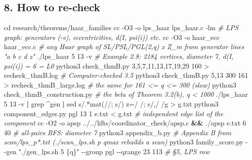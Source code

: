 \documentclass[
  10pt,
]{article}
\newenvironment{Shaded}{}{}
\newcommand{\AttributeTok}[1]{\textcolor[rgb]{0.49,0.56,0.16}{#1}}
\newcommand{\BuiltInTok}[1]{\textcolor[rgb]{0.00,0.50,0.00}{#1}}
\newcommand{\CommentTok}[1]{\textcolor[rgb]{0.38,0.63,0.69}{\textit{#1}}}
\newcommand{\ExtensionTok}[1]{#1}
\newcommand{\FunctionTok}[1]{\textcolor[rgb]{0.02,0.16,0.49}{#1}}
\newcommand{\KeywordTok}[1]{\textcolor[rgb]{0.00,0.44,0.13}{\textbf{#1}}}
\newcommand{\NormalTok}[1]{#1}
\newcommand{\OperatorTok}[1]{\textcolor[rgb]{0.40,0.40,0.40}{#1}}
\newcommand{\StringTok}[1]{\textcolor[rgb]{0.25,0.44,0.63}{#1}}
\begin{document}
\hypertarget{how-to-re-check}{%
\subsection{8. How to re-check}\label{how-to-re-check}}

\begin{Shaded}
\begin{Highlighting}[]
\BuiltInTok{cd}\NormalTok{ research/theorems/haar\_families}
\FunctionTok{cc} \AttributeTok{{-}O3} \AttributeTok{{-}o}\NormalTok{ lps\_haar lps\_haar.c }\AttributeTok{{-}lm}      \CommentTok{\# LPS graph: generators ({-}v), eccentricities, d(I, psi(i)) etc.}
\FunctionTok{cc} \AttributeTok{{-}O3} \AttributeTok{{-}o}\NormalTok{ haar\_ecc haar\_ecc.c          }\CommentTok{\# any Haar graph of SL/PSL/PGL(2,q) x Z\_m from generator lines "a b c d z"}
\ExtensionTok{./lps\_haar}\NormalTok{ 5 13 }\AttributeTok{{-}v}                     \CommentTok{\# Example 2.8: 2184 vertices, diameter 7, d(I, psi(i)) = 6 = L0}
\ExtensionTok{python3}\NormalTok{ check\_thmB.py 3,5,7,11,13,17,19,29 160 }\OperatorTok{\textgreater{}}\NormalTok{ recheck\_thmB.log     }\CommentTok{\# Computer{-}checked 3.5}
\ExtensionTok{python3}\NormalTok{ check\_thmB.py 5,13 300 161 }\OperatorTok{\textgreater{}}\NormalTok{ recheck\_thmB\_large.log           }\CommentTok{\# the same for 161 \textless{}= q \textless{}= 300 (slow)}
\ExtensionTok{python3}\NormalTok{ check\_thmB\_construction.py                                    }\CommentTok{\# the beta of Theorem 3.2(b), q \textless{} 1000}
\ExtensionTok{./lps\_haar}\NormalTok{ 5 13 }\AttributeTok{{-}v} \KeywordTok{|} \FunctionTok{grep} \StringTok{\textquotesingle{}\^{}gen\textquotesingle{}} \KeywordTok{|} \FunctionTok{sed} \StringTok{\textquotesingle{}s/.*mat(//; s/) z=/ /; s/,/ /g\textquotesingle{}} \OperatorTok{\textgreater{}}\NormalTok{ g.txt}
\ExtensionTok{python3}\NormalTok{ component\_edges.py pgl 13 1 e.txt }\OperatorTok{\textless{}}\NormalTok{ g.txt                    }\CommentTok{\# independent edge list of the component}
\FunctionTok{cc} \AttributeTok{{-}O2} \AttributeTok{{-}o}\NormalTok{ apsp ../../lifts/coordinator\_check/apsp.c }\KeywordTok{\&\&} \ExtensionTok{./apsp}\NormalTok{ e.txt 6 40   }\CommentTok{\# all{-}pairs BFS: diameter 7}
\ExtensionTok{python3}\NormalTok{ appendix\_b.py                  }\CommentTok{\# Appendix B from scan/lps\_p*.txt (./scan\_lps.sh p qmax rebuilds a scan)}
\ExtensionTok{python3}\NormalTok{ family\_score.py }\AttributeTok{{-}{-}gen} \StringTok{"./gen\_lps.sh 5 \{q\}"} \AttributeTok{{-}{-}group}\NormalTok{ pgl }\AttributeTok{{-}{-}qrange}\NormalTok{ 23 113   }\CommentTok{\# §5, LPS row}

\end{Highlighting}
\end{Shaded}
\end{document}
